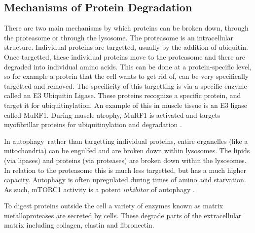 \documentclass{tufte-handout}
\begin{document}
\subsection{Mechanisms of Protein Degradation}

There are two main mechanisms by which proteins can be broken down, through the proteasome or through the lysosome.  The proteasome is an intracellular structure.  Individual proteins are targetted, usually by the addition of ubiquitin.  Once targetted, these individual proteins move to the proteasome and there are degraded into individual amino acids.  This can be done at a protein-specific level, so for example a protein that the cell wants to get rid of, can be very specifically targetted and removed.  The specificity of this targetting is via a specific enzyme called an E3 Ubiquitin Ligase.  These proteins recognize a specific protein, and target it for ubiquitinylation.  An example of this in muscle tissue is an E3 ligase called MuRF1.  During muscle atrophy, MuRF1 is activated and targets myofibrillar proteins for ubiquitinylation and degradation \citep{Bodine2014}.  

  In autophagy\, rather than targetting individual proteins, entire organelles (like a mitochondria) can be engulfed and are broken down within lysosomes.  The lipids (via lipases) and proteins (via proteases) are broken down within the lysosomes.  In relation to the proteasome this is much less targetted, but has a much higher capacity.  Autophagy is often upregulated during times of amino acid starvation.  As such, mTORC1 activity is a potent \emph{inhibitor} of autophagy \citep{Noda1998}.

  To digest proteins outside the cell a variety of enzymes known as matrix metalloproteases are secreted by cells.  These degrade parts of the extracellular matrix including collagen, elastin and fibronectin.
\end{document}
